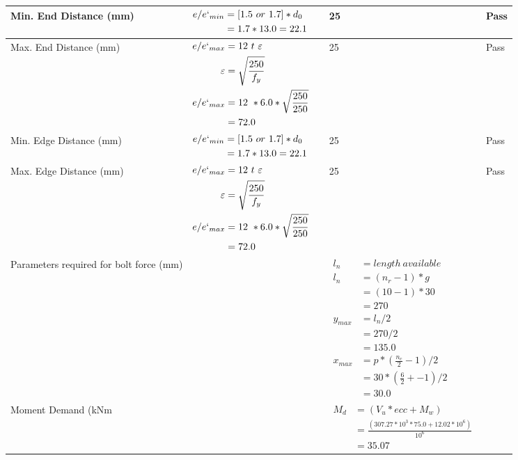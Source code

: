\documentclass{article}%
\begin{document}
\begin{longtable}{|p{4cm}|p{5cm}|p{5.5cm}|p{1.5cm}|}
\hline%
Min. End Distance (mm)&$\begin{aligned}e/e`_{min} &=[1.5~or~ 1.7] * d_0\\ &=1.7*13.0=22.1 \end{aligned}$&25&Pass\\%
\hline%
Max. End Distance (mm)&$\begin{aligned}e/e`_{max} &= 12~ t~ \varepsilon&\\ \varepsilon &= \sqrt{\frac{250}{f_y}}\\ e/e`_{max}&=12 ~*6.0*\sqrt{\frac{250}{250}}\\ &=72.0\\ \end{aligned}$&25&Pass\\%
\hline%
Min. Edge Distance (mm)&$\begin{aligned}e/e`_{min} &=[1.5~or~ 1.7] * d_0\\ &=1.7*13.0=22.1 \end{aligned}$&25&Pass\\%
\hline%
Max. Edge Distance (mm)&$\begin{aligned}e/e`_{max} &= 12~ t~ \varepsilon&\\ \varepsilon &= \sqrt{\frac{250}{f_y}}\\ e/e`_{max}&=12 ~*6.0*\sqrt{\frac{250}{250}}\\ &=72.0\\ \end{aligned}$&25&Pass\\%
\hline%
Parameters required for bolt force (mm)&&$\begin{aligned} l_n~~~ &= length~available \\  l_n~~~ &= (n_r - 1) * g\\  &= (10 - 1) *30\\  & =270\\  y_{max} &= l_n / 2\\  &= 270 / 2 \\  & =135.0\\ x_{max} &= p * (\frac{n_c}{2} - 1) / 2 \\  &= 30 * (\frac{6}{2} + - 1) / 2 \\  & =30.0\end{aligned}$&\\%
\hline%
Moment Demand (kNm&&$\begin{aligned}  M_d &= (V_u * ecc + M_w)\\  &= \frac{(307.27 * 10^3 *75.0 + 12.02*10^6)}{10^6}\\  & =35.07\end{aligned}$&\\%

\end{longtable}
\end{document}

